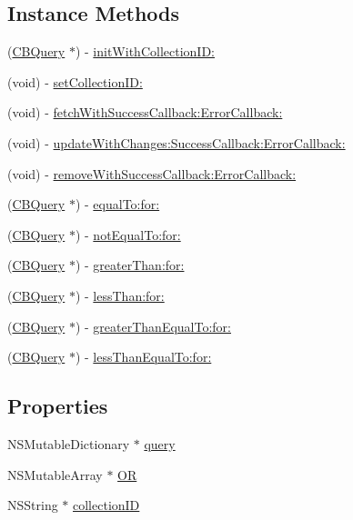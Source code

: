 \subsection*{Instance Methods}
\begin{DoxyCompactItemize}
\item 
(\hyperlink{interface_c_b_query}{C\-B\-Query} $\ast$) -\/ \hyperlink{interface_c_b_query_a945b8a169282151a97e6a0fd694cbb33}{init\-With\-Collection\-I\-D\-:}
\item 
(void) -\/ \hyperlink{interface_c_b_query_aa6df57d4b22629273cb22d39157ab234}{set\-Collection\-I\-D\-:}
\item 
(void) -\/ \hyperlink{interface_c_b_query_adea4d23bf64781d3c656ff27d0fd44e7}{fetch\-With\-Success\-Callback\-:\-Error\-Callback\-:}
\item 
(void) -\/ \hyperlink{interface_c_b_query_a38d2ee741a83dffaeefcc25e4d758c08}{update\-With\-Changes\-:\-Success\-Callback\-:\-Error\-Callback\-:}
\item 
(void) -\/ \hyperlink{interface_c_b_query_ab50b24d74f17a9ef72b88d4ac05831b3}{remove\-With\-Success\-Callback\-:\-Error\-Callback\-:}
\item 
(\hyperlink{interface_c_b_query}{C\-B\-Query} $\ast$) -\/ \hyperlink{interface_c_b_query_a9613e325533eb4519b28e9e3f24f9f42}{equal\-To\-:for\-:}
\item 
(\hyperlink{interface_c_b_query}{C\-B\-Query} $\ast$) -\/ \hyperlink{interface_c_b_query_a6f38448b1fa8cfeb6fb0e9a6661e2643}{not\-Equal\-To\-:for\-:}
\item 
(\hyperlink{interface_c_b_query}{C\-B\-Query} $\ast$) -\/ \hyperlink{interface_c_b_query_aed36ed38545e962c0e179f4d26e5e48f}{greater\-Than\-:for\-:}
\item 
(\hyperlink{interface_c_b_query}{C\-B\-Query} $\ast$) -\/ \hyperlink{interface_c_b_query_a5c7295f7e28c7e0ad782c88ed367c3e1}{less\-Than\-:for\-:}
\item 
(\hyperlink{interface_c_b_query}{C\-B\-Query} $\ast$) -\/ \hyperlink{interface_c_b_query_a2f725afd4a184970ec3b88e5b2a87b55}{greater\-Than\-Equal\-To\-:for\-:}
\item 
(\hyperlink{interface_c_b_query}{C\-B\-Query} $\ast$) -\/ \hyperlink{interface_c_b_query_aba3d55d2e25646372ec9639964b471c2}{less\-Than\-Equal\-To\-:for\-:}
\end{DoxyCompactItemize}
\subsection*{Properties}
\begin{DoxyCompactItemize}
\item 
N\-S\-Mutable\-Dictionary $\ast$ \hyperlink{interface_c_b_query_a896792b3b7ffa4a297fb91daedae2672}{query}
\item 
N\-S\-Mutable\-Array $\ast$ \hyperlink{interface_c_b_query_a6751257a696c57bd191fca92204fdfa7}{O\-R}
\item 
N\-S\-String $\ast$ \hyperlink{interface_c_b_query_ad7e594dc30699c9dbae407e55b588b00}{collection\-I\-D}
\end{DoxyCompactItemize}


